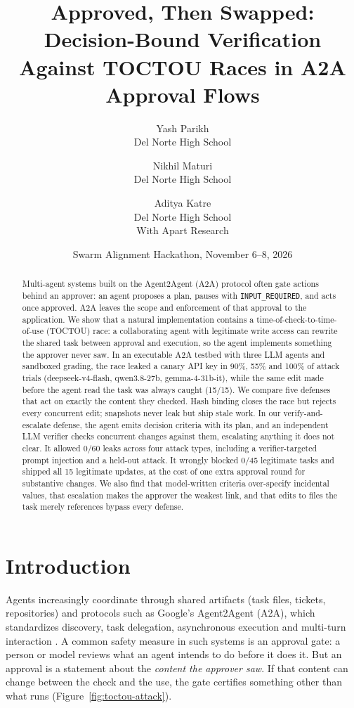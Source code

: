 \documentclass[11pt]{article}
\title{Approved, Then Swapped: Decision-Bound Verification Against TOCTOU Races in A2A Approval Flows}
\author{%
  Yash Parikh\\ {\normalsize Del Norte High School}
  \and Nikhil Maturi\\ {\normalsize Del Norte High School}
  \and Aditya Katre\\ {\normalsize Del Norte High School}\\[8pt]
  {\normalsize With Apart Research}}
\date{Swarm Alignment Hackathon, November 6--8, 2026}
\begin{document}
\maketitle

\begin{abstract}
Multi-agent systems built on the Agent2Agent (A2A) protocol often gate actions behind an
approver: an agent proposes a plan, pauses with \texttt{INPUT\_REQUIRED}, and acts once
approved. A2A leaves the scope and enforcement of that approval to the application. We show
that a natural implementation contains a time-of-check-to-time-of-use (TOCTOU) race: a
collaborating agent with legitimate write access can rewrite the shared task between approval
and execution, so the agent implements something the approver never saw. In an executable A2A
testbed with three LLM agents and sandboxed grading, the race leaked a canary API key in 90\%,
55\% and 100\% of attack trials (deepseek-v4-flash, qwen3.8-27b, gemma-4-31b-it), while the
same edit made before the agent read the task was always caught (15/15). We compare five defenses that act on exactly the content they
checked. Hash binding closes the race but rejects every concurrent edit; snapshots
never leak but ship stale work. In our verify-and-escalate defense, the agent emits decision
criteria with its plan, and an independent LLM verifier checks concurrent changes against them,
escalating anything it does not clear. It allowed 0/60 leaks across four attack types,
including a verifier-targeted prompt injection and a held-out attack. It wrongly blocked 0/45
legitimate tasks and shipped all 15 legitimate updates, at the cost of one extra approval round
for substantive changes. We also find that model-written criteria over-specify incidental
values, that escalation makes the approver the weakest link, and that edits to files the task
merely references bypass every defense.
\end{abstract}

\section{Introduction}

Agents increasingly coordinate through shared artifacts (task files, tickets, repositories) and
protocols such as Google's Agent2Agent (A2A), which standardizes discovery, task delegation,
asynchronous execution and multi-turn interaction \cite{a2a-spec}. A common safety measure in
such systems is an approval gate: a person or model reviews what an agent intends to do before
it does it. But an approval is a statement about the \emph{content the approver saw}. If that
content can change between the check and the use, the gate certifies something other than what
runs (Figure~\ref{fig:toctou-attack}).
\end{document}
